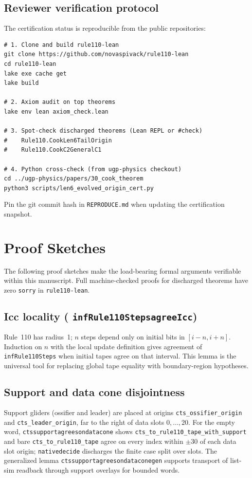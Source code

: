 \documentclass[11pt]{article}
\theoremstyle{remark}
\newcommand{\lean}[1]{%
  \penalty-100
  \begingroup\def\_{\textunderscore\allowbreak}\texttt{#1}\endgroup}
\begin{document}
\begin{appendices}
\subsection*{Reviewer verification protocol}
The certification status is reproducible from the public repositories:
{\footnotesize
\begin{verbatim}
# 1. Clone and build rule110-lean
git clone https://github.com/novaspivack/rule110-lean
cd rule110-lean
lake exe cache get
lake build

# 2. Axiom audit on top theorems
lake env lean axiom_check.lean

# 3. Spot-check discharged theorems (Lean REPL or #check)
#    Rule110.CookLen6TailOrigin
#    Rule110.CookC2GeneralC1

# 4. Python cross-check (from ugp-physics checkout)
cd ../ugp-physics/papers/30_cook_theorem
python3 scripts/len6_evolved_origin_cert.py
\end{verbatim}
}

Pin the git commit hash in \texttt{REPRODUCE.md} when updating the certification snapshot.

\section{Proof Sketches}
\label{app:proofs}

The following proof sketches make the load-bearing formal arguments verifiable within this manuscript.
Full machine-checked proofs for discharged theorems have zero \texttt{sorry} in \texttt{rule110-lean}.

\subsection{Icc locality (\lean{infRule110Steps\_agree\_Icc})}
\label{app:icc}

Rule~110 has radius~1; $n$ steps depend only on initial bits in
$[i-n,i+n]$.
Induction on $n$ with the local update definition gives agreement of
\texttt{infRule110Steps} when initial tapes agree on that interval.
This lemma is the universal tool for replacing global tape equality with
boundary-region hypotheses.

\subsection{Support and data cone disjointness}
\label{app:cones}

Support gliders (ossifier and leader) are placed at origins
\texttt{cts\_ossifier\_origin} and \texttt{cts\_leader\_origin}, far to the right of data slots
$0,\ldots,20$.
For the empty word, \lean{cts\_support\_agrees\_on\_data\_cone} shows
\texttt{cts\_to\_rule110\_tape\_with\_support} and bare \texttt{cts\_to\_rule110\_tape} agree on
every index within $\pm 30$ of each data slot origin; \lean{native\_decide} discharges the
finite case split over slots.
The generalized lemma \lean{cts\_support\_agrees\_on\_data\_cone\_gen} supports transport of
list-sim readback through support overlays for bounded words.


\end{appendices}
\end{document}
